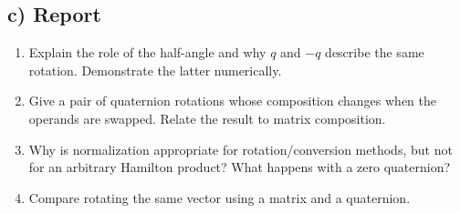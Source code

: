 \documentclass[11pt,a4paper]{article}
\begin{document}
\subsection*{c) Report}
\begin{enumerate}[leftmargin=*]
    \item Explain the role of the half-angle and why $q$ and $-q$ describe
    the same rotation. Demonstrate the latter numerically.
    \item Give a pair of quaternion rotations whose composition changes when
    the operands are swapped. Relate the result to matrix composition.
    \item Why is normalization appropriate for rotation/conversion methods,
    but not for an arbitrary Hamilton product? What happens with a zero quaternion?
    \item Compare rotating the same vector using a matrix and a quaternion.
\end{enumerate}





\end{document}
